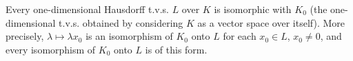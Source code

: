 Every one-dimensional Hausdorff t.v.s. $L$ over $K$ is isomorphic with $K_0$ (the one-dimensional t.v.s. obtained by considering $K$ as a vector space over itself). More precisely, $\lambda \mapsto \lambda x_0$ is an isomorphism of $K_0$ onto $L$ for each $x_0 \in L$, $x_0 \neq 0$, and every isomorphism of $K_0$ onto $L$ is of this form.
